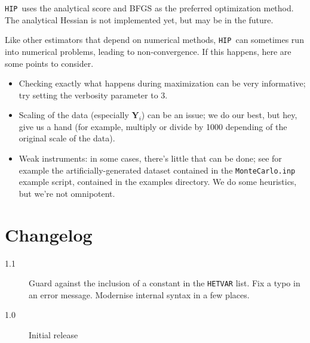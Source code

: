 \documentclass[a4paper,10pt]{article}
\newcommand{\app}[1]{\textsf{#1}}
\newcounter{script}[section]
\newcommand{\HIP}{\texttt{HIP}}
\newcommand{\Endog}{\mathbf{Y}_{i}}
\begin{document}
\HIP\ uses the analytical score and BFGS as the preferred optimization
method. The analytical Hessian is not implemented yet, but may be in
the future.

Like other estimators that depend on numerical methods, \HIP\ can
sometimes run into numerical problems, leading to non-convergence. 
If this happens, here are some points to consider.

\begin{itemize}
\item Checking exactly what happens during maximization can be very
  informative; try setting the verbosity parameter to 3.
\item Scaling of the data (especially $\Endog$) can be an issue; we do
  our best, but hey, give us a hand (for example, multiply or divide
  by 1000 depending of the original scale of the data).
\item Weak instruments: in some cases, there's little that can be
  done; see for example the artificially-generated dataset contained
  in the \texttt{MonteCarlo.inp} example script, contained in the
  examples directory. We do some heuristics, but we're not omnipotent.
\end{itemize}

\section{Changelog}
\begin{description}
\item[1.1] Guard against the inclusion of a constant in the
  \texttt{HETVAR} list. Fix a typo in an error message. Modernise
  internal syntax in a few places.
\item[1.0] Initial release
\end{description}



\clearpage
\appendix


\end{document}
